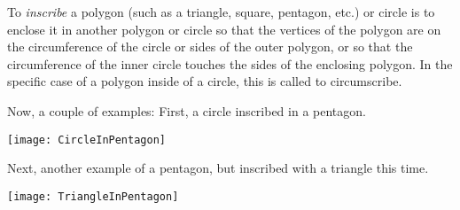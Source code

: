 \documentclass[12pt]{article}
\begin{document}
To \emph{inscribe} a polygon (such as a triangle, square, pentagon, etc.) or circle is to enclose it in another polygon or circle so that the vertices of the polygon are on the circumference of the circle or sides of the outer polygon, or so that the circumference of the inner circle touches the sides of the enclosing polygon. In the specific case of a polygon inside of a circle, this is called to circumscribe.

Now, a couple of examples: First, a circle inscribed in a pentagon.

\begin{center}
\texttt{[image: CircleInPentagon]}
\end{center}

Next, another example of a pentagon, but inscribed with a triangle this time.

\begin{center}
\texttt{[image: TriangleInPentagon]}
\end{center}

\end{document}
